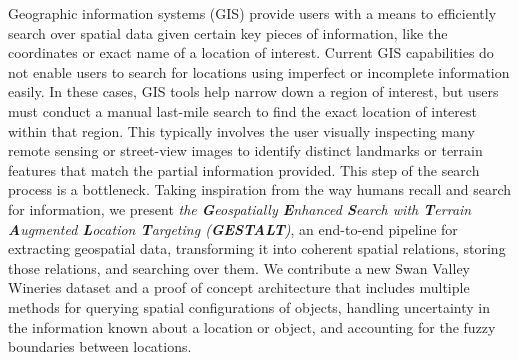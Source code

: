 

Geographic information systems (GIS) provide users with a means to efficiently search over spatial data given certain key pieces of information, like the coordinates or exact name of a location of interest. Current GIS capabilities do not enable users to search for locations using imperfect or incomplete information easily. In these cases, GIS tools help narrow down a region of interest, but users must conduct a manual last-mile search to find the exact location of interest within that region. This typically involves the user visually inspecting many remote sensing or street-view images to identify distinct landmarks or terrain features that match the partial information provided. This step of the search process is a bottleneck. Taking inspiration from the way humans recall and search for information, we present \textit{the \textbf{G}eospatially \textbf{E}nhanced \textbf{S}earch with \textbf{T}errain \textbf{A}ugmented \textbf{L}ocation \textbf{T}argeting (\textbf{GESTALT})}, an end-to-end pipeline for extracting geospatial data, transforming it into coherent spatial relations, storing those relations, and searching over them. We contribute a new Swan Valley Wineries dataset and a proof of concept architecture that includes multiple methods for querying spatial configurations of objects, handling uncertainty in the information known about a location or object, and accounting for the fuzzy boundaries between locations.